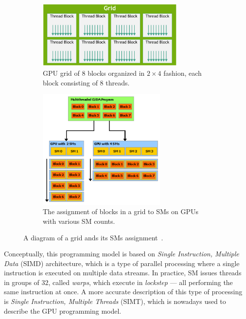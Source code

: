 \begin{figure}
	\centering
	\begin{subfigure}{.5\textwidth}
		\centering
        \includegraphics[width=0.8\textwidth]{img/grid}
        \caption{GPU grid of $8$ blocks organized in $2\times4$ fashion, each block consisting of $8$ threads.}
        \label{fig:grid}
	\end{subfigure}%
	\begin{subfigure}{.5\textwidth}
		\centering
        \includegraphics[width=0.7\textwidth]{img/grid-sm}
        \caption{The assignment of blocks in a grid to SMs on GPUs with various SM counts.}
        \label{fig:grid-sm}
	\end{subfigure}
    \caption{A diagram of a grid ands its SMs assignment~\cite{site:cuda}.}
\end{figure}

Conceptually, this programming model is based on \emph{Single Instruction, Multiple Data} (SIMD) architecture, which is a type of parallel processing where a single instruction is executed on multiple data streams. In practice, SM issues threads in groups of $32$, called \emph{warps}, which execute in \emph{lockstep} --- all performing the same instruction at once. A more accurate description of this type of processing is \emph{Single Instruction, Multiple Threads} (SIMT), which is nowadays used to describe the GPU programming model.

